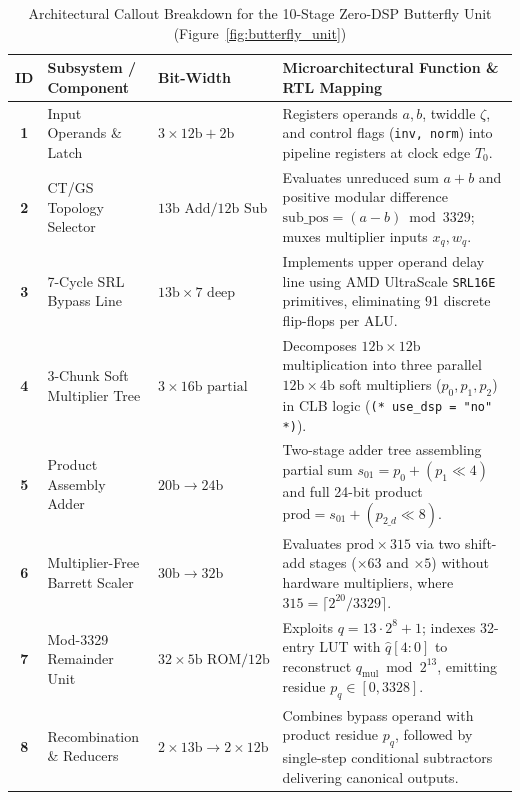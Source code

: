 \begin{table}[!t]
\caption{Architectural Callout Breakdown for the 10-Stage Zero-DSP Butterfly Unit (Figure~\ref{fig:butterfly_unit})}
\label{tab:butterfly_callouts}
\centering
\footnotesize
\begin{tabular*}{\textwidth}{@{\extracolsep{\fill}} cllp{8.5cm} @{}}
\toprule
\textbf{ID} & \textbf{Subsystem / Component} & \textbf{Bit-Width} & \textbf{Microarchitectural Function \& RTL Mapping} \\
\midrule
\textbf{1} & Input Operands \& Latch & $3 \times 12\text{b} + 2\text{b}$ & Registers operands $a, b$, twiddle $\zeta$, and control flags (\texttt{inv, norm}) into pipeline registers at clock edge $T_0$. \\
\textbf{2} & CT/GS Topology Selector & $13\text{b Add} / 12\text{b Sub}$ & Evaluates unreduced sum $a+b$ and positive modular difference $\text{sub\_pos} = (a-b) \bmod 3329$; muxes multiplier inputs $x_q, w_q$. \\
\textbf{3} & 7-Cycle SRL Bypass Line & $13\text{b} \times 7\text{ deep}$ & Implements upper operand delay line using AMD UltraScale \texttt{SRL16E} primitives, eliminating 91 discrete flip-flops per ALU. \\
\textbf{4} & 3-Chunk Soft Multiplier Tree & $3 \times 16\text{b partial}$ & Decomposes $12\text{b} \times 12\text{b}$ multiplication into three parallel $12\text{b} \times 4\text{b}$ soft multipliers ($p_0, p_1, p_2$) in CLB logic (\texttt{(* use\_dsp = "no" *)}). \\
\textbf{5} & Product Assembly Adder & $20\text{b} \to 24\text{b}$ & Two-stage adder tree assembling partial sum $s_{01} = p_0 + (p_1 \ll 4)$ and full 24-bit product $\text{prod} = s_{01} + (p_{2\_d} \ll 8)$. \\
\textbf{6} & Multiplier-Free Barrett Scaler & $30\text{b} \to 32\text{b}$ & Evaluates $\text{prod} \times 315$ via two shift-add stages ($\times 63$ and $\times 5$) without hardware multipliers, where $315 = \lceil 2^{20}/3329 \rceil$. \\
\textbf{7} & Mod-3329 Remainder Unit & $32 \times 5\text{b ROM} / 12\text{b}$ & Exploits $q = 13 \cdot 2^8 + 1$; indexes 32-entry LUT with $\hat{q}[4:0]$ to reconstruct $q_{\text{mul}} \bmod 2^{13}$, emitting residue $p_q \in [0, 3328]$. \\
\textbf{8} & Recombination \& Reducers & $2 \times 13\text{b} \to 2 \times 12\text{b}$ & Combines bypass operand with product residue $p_q$, followed by single-step conditional subtractors delivering canonical outputs. \\
\bottomrule
\end{tabular*}
\end{table}

